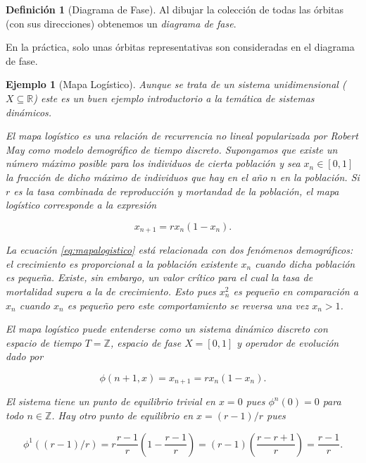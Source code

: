 \documentclass[11pt]{book}
\theoremstyle{definition}
\newtheorem{definition}{Definición}
\numberwithin{definition}{section}
\theoremstyle{theorem}
\numberwithin{theorem}{section}
\numberwithin{lemma}{section}
\numberwithin{corollary}{section}
\theoremstyle{plain}
\newtheorem{example}{Ejemplo}
\numberwithin{example}{section}
\newcommand{\Z}{{\ensuremath{\mathbb{Z}}}}
\newcommand{\R}{{\ensuremath{\mathbb{R}}}}
\begin{document}
\begin{definition}[Diagrama de Fase]
  \label{def:phasediagram}Al dibujar la colecci\'on de todas las \'orbitas
  (con sus direcciones) obtenemos un {\emph{diagrama de fase}}.
\end{definition}
En la pr\'actica, solo unas \'orbitas representativas son consideradas en el diagrama de fase.

\begin{example}[Mapa Logístico]
Aunque se trata de un sistema unidimensional ($X \subseteq \R$) este es un buen ejemplo introductorio a la temática de sistemas dinámicos.

El mapa logístico es una relación de recurrencia no lineal popularizada por Robert May \cite{may76} como modelo demográfico de tiempo discreto.
Supongamos que existe un número máximo posible para los individuos de cierta población y sea $x_n \in [0,1]$ la fracción de dicho máximo de individuos que hay en el año $n$ en la población. Si $r$ es la tasa combinada de reproducción y mortandad de la población, el mapa logístico corresponde a la expresión

\begin{equation} \label{eq:mapalogistico}
x_{n+1} = rx_n(1-x_n).
\end{equation}

La ecuación \ref{eq:mapalogistico} está relacionada con dos fenómenos demográficos: el crecimiento es proporcional a la población existente $x_n$ cuando dicha población es pequeña. Existe, sin embargo, un valor crítico para el cual la tasa de mortalidad supera a la de crecimiento.
Esto pues $x_n^2$ es pequeño en comparación a $x_n$ cuando $x_n$ es pequeño pero este comportamiento se reversa una vez $x_n > 1$.

El mapa logístico puede entenderse como un sistema dinámico discreto con espacio de tiempo $T = \Z$, espacio de fase $X = [0,1]$ y operador de evolución dado por

\begin{equation} \label{eq:evolucionmapalogistico}
	\phi(n + 1, x) = x_{n+1} = rx_n(1-x_n).
\end{equation}

El sistema tiene un punto de equilibrio trivial en $x = 0$ pues $\phi^n(0) = 0$ para todo $n \in \Z$. Hay otro punto de equilibrio en $x = (r-1)/r$ pues

$$ \phi^1((r-1)/r) = r \frac{r-1}{r} \left(1 - \frac{r-1}{r} \right) = (r-1) \left( \frac{r - r + 1}{r} \right) = \frac{r-1}{r}. $$


\end{example}
\end{document}

